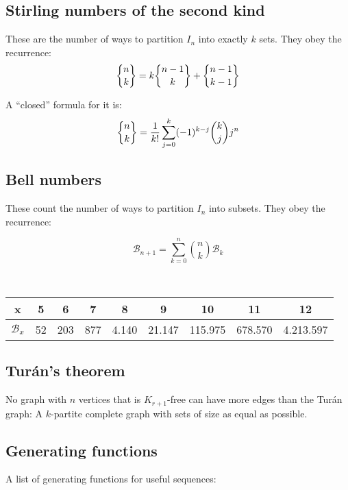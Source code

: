 \subsection{Stirling numbers of the second kind} These are the number of ways to partition $I_n$ into exactly $k$ sets. They obey the recurrence:
\begin{equation*}
    \stirlingsecond{n}{k} = k\stirlingsecond{n-1}{k} + \stirlingsecond{n-1}{k-1}
\end{equation*}

A ``closed'' formula for it is:
\begin{equation*}
    \stirlingsecond{n}{k} = \frac{1}{k!}\sum_{j=0}^k (-1)^{k-j} \binom{k}{j} j^n
\end{equation*}

\subsection{Bell numbers} These count the number of ways to partition $I_n$ into subsets. They obey the recurrence:

\begin{equation*}
    \mathcal{B}_{n+1} = \sum_{k=0}^n \binom{n}{k} \mathcal{B}_k
\end{equation*}

\

\begin{tabular}{|c|c|c|c|c|c|c|c|c|}
    \hline
    x&5&6&7&8&9&10&11&12 \\ \hline
    $\mathcal{B}_x$&52&203&877&4.140&21.147&115.975&678.570&4.213.597 \\ \hline
\end{tabular}


\subsection{Turán's theorem} No graph with $n$ vertices that is $K_{r+1}$-free can have more edges than the Turán graph: A $k$-partite complete graph with sets of size as equal as possible.

\subsection{Generating functions}
A list of generating functions for useful sequences:

\

